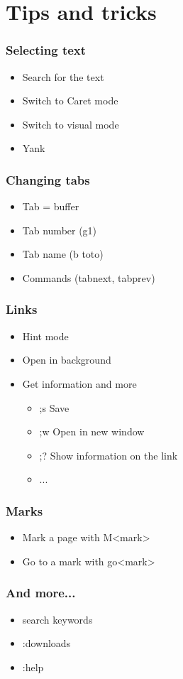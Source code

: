 \section{Tips and tricks} %
\setcounter{subsection}{1}

\begin{frame}
\frametitle{Selecting text}
  \begin{itemize}[<+->]
    \item Search for the text
    \item Switch to Caret mode
    \item Switch to visual mode
    \item Yank
  \end{itemize}
\end{frame}

\begin{frame}
\frametitle{Changing tabs}
  \begin{itemize}[<+->]
    \item Tab = buffer
    \item Tab number (g1)
    \item Tab name (b toto)
    \item Commands (tabnext, tabprev)
  \end{itemize}
\end{frame}

\begin{frame}
\frametitle{Links}
  \begin{itemize}[<+->]
    \item Hint mode
    \item Open in background
    \item Get information and more
    \begin{itemize}
      \item ;s Save
      \item ;w Open in new window
      \item ;? Show information on the link
      \item ...
    \end{itemize}
  \end{itemize}
\end{frame}

\begin{frame}
\frametitle{Marks}
  \begin{itemize}[<+->]
    \item Mark a page with M<mark>
    \item Go to a mark with go<mark>
  \end{itemize}
\end{frame}

\begin{frame}
\frametitle{And more...}
  \begin{itemize}[<+->]
    \item search keywords
    \item :downloads
    \item :help
  \end{itemize}
\end{frame}
